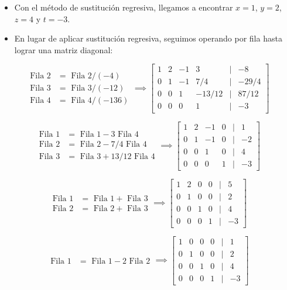 \documentclass[]{book}
\providecommand{\tightlist}{%
  \setlength{\itemsep}{0pt}\setlength{\parskip}{0pt}}
\begin{document}
\begin{itemize}
\tightlist
\item
  Con el método de sustitución regresiva, llegamos a encontrar \(x=1\), \(y=2\), \(z=4\) y \(t=-3\).
\item
  En lugar de aplicar sustitución regresiva, seguimos operando por fila hasta lograr una matriz diagonal:
\end{itemize}

\[
\begin{array}{cl}
\text{Fila 2} &= \text{ Fila 2} / (-4) \\ 
\text{Fila 3} &= \text{ Fila 3} /(-12) \\
\text{Fila 4} &= \text{ Fila 4} / (-136) 
\end{array}
\implies
\begin{bmatrix}
1 & 2 & -1 & 3 &|& -8\\
0 & 1 & -1 & 7/4 &|& -29/4\\
0 & 0 & 1 & -13/12 &|& 87/12\\
0 & 0 & 0 & 1 &|& -3  
\end{bmatrix}
\]

\[
\begin{array}{cl}
\text{Fila 1} &= \text{ Fila 1} - 3 \text{ Fila 4} \\ 
\text{Fila 2} &= \text{ Fila 2} - 7/4 \text{ Fila 4}\\
\text{Fila 3} &= \text{ Fila 3} + 13/12 \text{ Fila 4} 
\end{array}
\implies
\begin{bmatrix}
1 & 2 & -1 & 0 &|& 1\\
0 & 1 & -1 & 0 &|& -2\\
0 & 0 & 1 & 0 &|& 4\\
0 & 0 & 0 & 1 &|& -3  
\end{bmatrix}
\]

\[
\begin{array}{cl}
\text{Fila 1} &= \text{ Fila 1} + \text{ Fila 3} \\ 
\text{Fila 2} &= \text{ Fila 2} + \text{ Fila 3}
\end{array}
\implies
\begin{bmatrix}
1 & 2 & 0 & 0 &|& 5\\
0 & 1 & 0 & 0 &|& 2\\
0 & 0 & 1 & 0 &|& 4\\
0 & 0 & 0 & 1 &|& -3  
\end{bmatrix}
\]

\[
\begin{array}{cl}
\text{Fila 1} &= \text{ Fila 1} -2 \text{ Fila 2} 
\end{array}
\implies
\begin{bmatrix}
1 & 0 & 0 & 0 &|& 1\\
0 & 1 & 0 & 0 &|& 2\\
0 & 0 & 1 & 0 &|& 4\\
0 & 0 & 0 & 1 &|& -3  
\end{bmatrix}
\]
\end{document}
